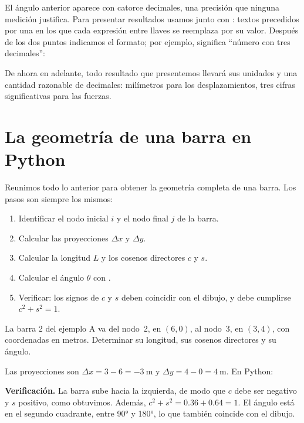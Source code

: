 El ángulo anterior aparece con catorce decimales, una precisión que ninguna
medición justifica. Para presentar resultados usamos  junto con
: textos precedidos por una
 en los que cada expresión entre llaves se reemplaza por su valor.
Después de los dos puntos indicamos el formato; por ejemplo, 
significa \enquote{número con tres decimales}:

De ahora en adelante, todo resultado que presentemos llevará sus unidades y
una cantidad razonable de decimales: milímetros para los desplazamientos, tres
cifras significativas para las fuerzas.

\section{La geometría de una barra en Python}\label{sec:barra_python}

Reunimos todo lo anterior para obtener la geometría completa de una barra.
Los pasos son siempre los mismos:

\begin{estrategia}
\begin{enumerate}
  \item Identificar el nodo inicial $i$ y el nodo final $j$ de la barra.
  \item Calcular las proyecciones $\Delta x$ y $\Delta y$.
  \item Calcular la longitud $L$ y los cosenos directores $c$ y $s$.
  \item Calcular el ángulo $\theta$ con .
  \item Verificar: los signos de $c$ y $s$ deben coincidir con el dibujo, y
    debe cumplirse $c^2 + s^2 = 1$.
\end{enumerate}
\end{estrategia}

\begin{problemaresuelto}
La barra 2 del ejemplo A va del nodo~2, en $(6, 0)$, al nodo~3, en
$(3, 4)$, con coordenadas en metros. Determinar su longitud, sus cosenos
directores y su ángulo.

\solucion
Las proyecciones son $\Delta x = 3 - 6 = \SI{-3}{\metre}$ y
$\Delta y = 4 - 0 = \SI{4}{\metre}$. En Python:

\textbf{Verificación.} La barra sube hacia la izquierda, de modo que $c$ debe
ser negativo y $s$ positivo, como obtuvimos. Además,
$c^2 + s^2 = 0.36 + 0.64 = 1$. El ángulo está en el segundo cuadrante, entre
\ang{90} y \ang{180}, lo que también coincide con el dibujo.
\end{problemaresuelto}

